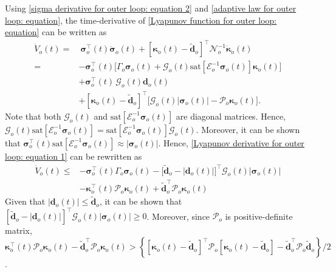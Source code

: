 \documentclass[lettersize,journal]{IEEEtran}
\begin{document}
\noindent Using \eqref{sigma derivative for outer loop: equation 2} and \eqref{adaptive law for outer loop: equation}, the time-derivative of \eqref{Lyapunov function for outer loop: equation} can be written as
\begin{align}
\label{Lyapunov derivative for outer loop: equation 1}
   \dot{V}_o(t)=&~\boldsymbol{\sigma}_o^{\top}(t) \dot{\boldsymbol{\sigma}}_o(t) + \left[\boldsymbol{\kappa}_o(t) - \tilde{\boldsymbol{d}}_{o}\right]^{\top} \mathcal{N}_o^{-1} \dot{\boldsymbol{\kappa}}_o(t)\nonumber\\
   =&- \boldsymbol{\sigma}_o^{\top}(t) \Big[\Gamma_o \boldsymbol{\sigma}_o(t) + \mathcal{G}_o(t) \text{sat}[ \mathcal{E}_o^{-1}\boldsymbol{\sigma}_o(t)] \boldsymbol{\kappa}_o(t)\Big] \nonumber \\ 
   &+ \boldsymbol{\sigma}_o^{\top}(t) \, \mathcal{G}_o(t) \boldsymbol{d}_o(t) \nonumber\\
   ~ & +\left[\boldsymbol{\kappa}_o(t) - \tilde{\boldsymbol{d}}_{o}\right]^{\top} \Big[\mathcal{G}_o(t) \lvert \boldsymbol{\sigma}_o(t) \rvert - \mathcal{P}_{o} \boldsymbol{\kappa}_o(t)\Big].
\end{align} 
Note that both $\mathcal{G}_o(t)$ and $\text{sat}[ \mathcal{E}_o^{-1}\boldsymbol{\sigma}_o(t)]$ are diagonal matrices. Hence, $\mathcal{G}_o(t) \text{sat}[ \mathcal{E}_o^{-1}\boldsymbol{\sigma}_o(t)] = \text{sat}[ \mathcal{E}_o^{-1}\boldsymbol{\sigma}_o(t)] \mathcal{G}_o(t)$.
Moreover, it can be shown that $\boldsymbol{\sigma}_o^{\top}(t) \text{sat}[ \mathcal{E}_o^{-1}\boldsymbol{\sigma}_o(t)] \approx \lvert \boldsymbol{\sigma}_o(t) \rvert$.
Hence, \eqref{Lyapunov derivative for outer loop: equation 1} can be rewritten as 
\begin{align}
\label{Lyapunov derivative for outer loop: equation 2}
   \dot{V}_o(t) \leq&- \boldsymbol{\sigma}_o^{\top}(t) \Gamma_o \boldsymbol{\sigma}_o(t) - \big[ \tilde{\boldsymbol{d}}_{o} - \lvert \boldsymbol{d}_o(t) \rvert\big]^{\top} \mathcal{G}_o(t) \lvert \boldsymbol{\sigma}_o(t) \rvert \nonumber\\
   ~ & - \boldsymbol{\kappa}_o^{\top}(t) \mathcal{P}_{o} \boldsymbol{\kappa}_o(t) + \tilde{\boldsymbol{d}}_{o}^{\top} \mathcal{P}_{o} \boldsymbol{\kappa}_o(t)
\end{align}
Given that $\lvert \boldsymbol{d}_o(t) \rvert \leq \tilde{\boldsymbol{d}}_{o}$, it can be shown that $\left[\tilde{\boldsymbol{d}}_{o} -\lvert \boldsymbol{d}_o(t) \rvert\right]^{\top} \mathcal{G}_o(t) \lvert \boldsymbol{\sigma}_o(t) \rvert \geq 0$.
Moreover, since $\mathcal{P}_{o}$ is positive-definite matrix, $\boldsymbol{\kappa}_o^{\top}(t) \mathcal{P}_{o} \boldsymbol{\kappa}_o(t) - \tilde{\boldsymbol{d}}_{o}^{\top} \mathcal{P}_{o} \boldsymbol{\kappa}_o(t) > \left\{\left[\boldsymbol{\kappa}_o(t) - \tilde{\boldsymbol{d}}_{o}\right]^{\top} \mathcal{P}_{o} \left[\boldsymbol{\kappa}_o(t) - \tilde{\boldsymbol{d}}_{o}\right] - \tilde{\boldsymbol{d}}_{o}^{\top} \mathcal{P}_{o} \tilde{\boldsymbol{d}}_{o} \right\}/2$.
\end{document}
